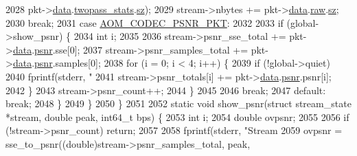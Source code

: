 \begin{DoxyCodeInclude}
{{{{{{{{{{{{{{{{{{{{{{{{{{{{{{{{{{{{{{{2028                     pkt->\hyperlink{structaom__codec__cx__pkt_afb379cd4bfa7692d1d6e85f4e4b2b410}{data}.\hyperlink{structaom__codec__cx__pkt_a40d469839bcd8195c3c8e80db6561dbb}{twopass\_stats}.\hyperlink{structaom__fixed__buf_a02f47e8b960c332c60a8aa4b7e37426f}{sz});
2029         stream->nbytes += pkt->\hyperlink{structaom__codec__cx__pkt_afb379cd4bfa7692d1d6e85f4e4b2b410}{data}.\hyperlink{structaom__codec__cx__pkt_a4fc6ea5e240c5df0acbf77aa2fe5ec6f}{raw}.\hyperlink{structaom__fixed__buf_a02f47e8b960c332c60a8aa4b7e37426f}{sz};
2030         \textcolor{keywordflow}{break};
2031       \textcolor{keywordflow}{case} \hyperlink{group__encoder_ggafeb69da4a9649a54e805f59c26d8dfeda3293bb764f30c11e9583510029578b75}{AOM\_CODEC\_PSNR\_PKT}:
2032 
2033         \textcolor{keywordflow}{if} (global->show\_psnr) \{
2034           \textcolor{keywordtype}{int} i;
2035 
2036           stream->psnr\_sse\_total += pkt->\hyperlink{structaom__codec__cx__pkt_afb379cd4bfa7692d1d6e85f4e4b2b410}{data}.\hyperlink{structaom__codec__cx__pkt_a3a38e942aa0da463260a05eb05f51762}{psnr}.sse[0];
2037           stream->psnr\_samples\_total += pkt->\hyperlink{structaom__codec__cx__pkt_afb379cd4bfa7692d1d6e85f4e4b2b410}{data}.\hyperlink{structaom__codec__cx__pkt_a3a38e942aa0da463260a05eb05f51762}{psnr}.samples[0];
2038           \textcolor{keywordflow}{for} (i = 0; i < 4; i++) \{
2039             \textcolor{keywordflow}{if} (!global->quiet)
2040               fprintf(stderr, \textcolor{stringliteral}{"%
2041             stream->psnr\_totals[i] += pkt->\hyperlink{structaom__codec__cx__pkt_afb379cd4bfa7692d1d6e85f4e4b2b410}{data}.\hyperlink{structaom__codec__cx__pkt_a3a38e942aa0da463260a05eb05f51762}{psnr}.psnr[i];
2042           \}
2043           stream->psnr\_count++;
2044         \}
2045 
2046         \textcolor{keywordflow}{break};
2047       \textcolor{keywordflow}{default}: \textcolor{keywordflow}{break};
2048     \}
2049   \}
2050 \}
2051 
2052 \textcolor{keyword}{static} \textcolor{keywordtype}{void} show\_psnr(\textcolor{keyword}{struct} stream\_state *stream, \textcolor{keywordtype}{double} peak, int64\_t bps) \{
2053   \textcolor{keywordtype}{int} i;
2054   \textcolor{keywordtype}{double} ovpsnr;
2055 
2056   \textcolor{keywordflow}{if} (!stream->psnr\_count) \textcolor{keywordflow}{return};
2057 
2058   fprintf(stderr, \textcolor{stringliteral}{"Stream %
2059   ovpsnr = sse\_to\_psnr((\textcolor{keywordtype}{double})stream->psnr\_samples\_total, peak,
}}}}}}}}}}}}}}}}}}}}}}}}}}}}}}}}}}}}}}}}}
\end{DoxyCodeInclude}
